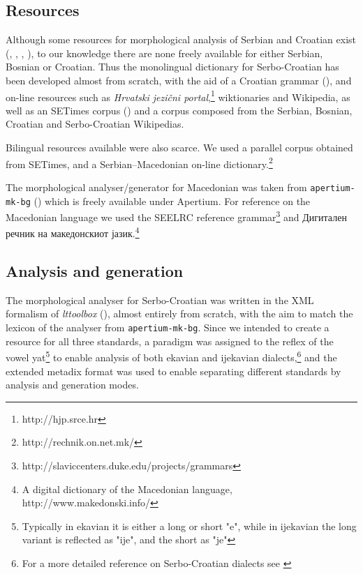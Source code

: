 \documentclass{book}
\begin{document}
\subsection*{Resources}
Although some resources for morphological analysis of Serbian and Croatian exist
(\citealp{vitas2004intex}, \citealp{vitas2003processing}, \citealp{agic2008improving}, \citealp{snajder08automatic}), 
to our knowledge there are none freely available for either Serbian, Bosnian or 
Croatian. Thus the monolingual dictionary for Serbo-Croatian has been developed 
almost from scratch, with the aid of a Croatian grammar (\citealp{baric1997hrvatska}), 
and on-line resources such as \emph{Hrvatski jezični portal},\footnote{http://hjp.srce.hr}
wiktionaries and Wikipedia, as well as an SETimes corpus (\citealp{tyers2010south}) and a 
corpus composed from the Serbian, Bosnian, Croatian and Serbo-Croatian Wikipedias.

Bilingual resources available were also scarce. We used a parallel corpus obtained from
SETimes, and a Serbian--Macedonian on-line dictionary.\footnote{http://rechnik.on.net.mk/}

The morphological analyser/generator for Macedonian was taken from
{\small{\tt apertium-mk-bg}} (\citealp{rangelov2011rule}) which is freely available under Apertium.
For reference on the Macedonian language we used the SEELRC reference grammar\footnote{http://slaviccenters.duke.edu/projects/grammars} and
Дигитален речник на македонскиот јазик.\footnote{A digital dictionary of the Macedonian language, http://www.makedonski.info/}

\subsection*{Analysis and generation}
The morphological analyser for Serbo-Croatian was written in the XML formalism of
\emph{lttoolbox} (\citealp{rojas2005construccion}), almost entirely from scratch, with the
aim to match the lexicon of the analyser from {\small{\tt apertium-mk-bg}}. Since we intended to create a resource for all three
standards, a paradigm was assigned
to the reflex of the vowel yat\footnote{Typically in ekavian it is either a long or short "e", while in ijekavian the long variant is reflected as "ije", and the short as "je"} to enable analysis of both ekavian and ijekavian dialects,\footnote{For a more detailed reference on Serbo-Croatian dialects see \cite{brown2004handbook}} and the extended metadix format was used to enable separating different standards by
analysis and generation modes.
\end{document}
